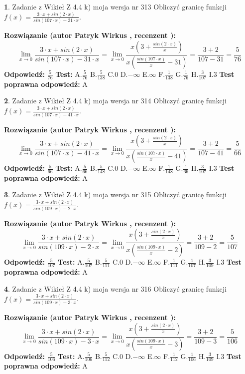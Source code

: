 \documentclass[12pt, a4paper]{article}
\theoremstyle{definition} %
\newtheorem{zad}{}
\newcommand{\zadStart}[1]{\begin{zad}#1\newline}
\newcommand{\zadStop}{\end{zad}}
\newcommand{\rozwStart}[2]{\noindent \textbf{Rozwiązanie (autor #1 , recenzent #2): }\newline}
\newcommand{\rozwStop}{\newline}
\newcommand{\odpStart}{\noindent \textbf{Odpowiedź:}\newline}
\newcommand{\odpStop}{\newline}
\newcommand{\testStart}{\noindent \textbf{Test:}\newline}
\newcommand{\testStop}{\newline}
\newcommand{\kluczStart}{\noindent \textbf{Test poprawna odpowiedź:}\newline}
\newcommand{\kluczStop}{\newline}
\begin{document}
\zadStart{Zadanie z Wikieł Z 4.4 k) moja wersja nr 313}
Obliczyć granicę funkcji $f(x)=\frac{3\cdot x +sin(2\cdot x)}{sin(107\cdot x) -31\cdot x}$.
\zadStop
\rozwStart{Patryk Wirkus}{}
$$\lim\limits_{x\to 0}\frac{3\cdot x +sin(2\cdot x)}{sin(107\cdot x) -31\cdot x}
=\lim\limits_{x\to 0}\frac{x(3+\frac{sin(2\cdot x)}{x})}{x(\frac{sin(107\cdot x)}{x}-31)}
=\frac{3+2}{107-31} = \frac{5}{76}$$
\rozwStop
\odpStart
$\frac{5}{76}$
\odpStop
\testStart
A.$\frac{5}{76}$
B.$\frac{5}{138}$
C.$0$
D.$-\infty$
E.$\infty$
F.$\frac{1}{138}$
G.$\frac{1}{76}$
H.$\frac{3}{107}$
I.$3$
\testStop
\kluczStart
A
\kluczStop



\zadStart{Zadanie z Wikieł Z 4.4 k) moja wersja nr 314}
Obliczyć granicę funkcji $f(x)=\frac{3\cdot x +sin(2\cdot x)}{sin(107\cdot x) -41\cdot x}$.
\zadStop
\rozwStart{Patryk Wirkus}{}
$$\lim\limits_{x\to 0}\frac{3\cdot x +sin(2\cdot x)}{sin(107\cdot x) -41\cdot x}
=\lim\limits_{x\to 0}\frac{x(3+\frac{sin(2\cdot x)}{x})}{x(\frac{sin(107\cdot x)}{x}-41)}
=\frac{3+2}{107-41} = \frac{5}{66}$$
\rozwStop
\odpStart
$\frac{5}{66}$
\odpStop
\testStart
A.$\frac{5}{66}$
B.$\frac{5}{148}$
C.$0$
D.$-\infty$
E.$\infty$
F.$\frac{1}{148}$
G.$\frac{1}{66}$
H.$\frac{3}{107}$
I.$3$
\testStop
\kluczStart
A
\kluczStop



\zadStart{Zadanie z Wikieł Z 4.4 k) moja wersja nr 315}
Obliczyć granicę funkcji $f(x)=\frac{3\cdot x +sin(2\cdot x)}{sin(109\cdot x) -2\cdot x}$.
\zadStop
\rozwStart{Patryk Wirkus}{}
$$\lim\limits_{x\to 0}\frac{3\cdot x +sin(2\cdot x)}{sin(109\cdot x) -2\cdot x}
=\lim\limits_{x\to 0}\frac{x(3+\frac{sin(2\cdot x)}{x})}{x(\frac{sin(109\cdot x)}{x}-2)}
=\frac{3+2}{109-2} = \frac{5}{107}$$
\rozwStop
\odpStart
$\frac{5}{107}$
\odpStop
\testStart
A.$\frac{5}{107}$
B.$\frac{5}{111}$
C.$0$
D.$-\infty$
E.$\infty$
F.$\frac{1}{111}$
G.$\frac{1}{107}$
H.$\frac{3}{109}$
I.$3$
\testStop
\kluczStart
A
\kluczStop



\zadStart{Zadanie z Wikieł Z 4.4 k) moja wersja nr 316}
Obliczyć granicę funkcji $f(x)=\frac{3\cdot x +sin(2\cdot x)}{sin(109\cdot x) -3\cdot x}$.
\zadStop
\rozwStart{Patryk Wirkus}{}
$$\lim\limits_{x\to 0}\frac{3\cdot x +sin(2\cdot x)}{sin(109\cdot x) -3\cdot x}
=\lim\limits_{x\to 0}\frac{x(3+\frac{sin(2\cdot x)}{x})}{x(\frac{sin(109\cdot x)}{x}-3)}
=\frac{3+2}{109-3} = \frac{5}{106}$$
\rozwStop
\odpStart
$\frac{5}{106}$
\odpStop
\testStart
A.$\frac{5}{106}$
B.$\frac{5}{112}$
C.$0$
D.$-\infty$
E.$\infty$
F.$\frac{1}{112}$
G.$\frac{1}{106}$
H.$\frac{3}{109}$
I.$3$
\testStop
\kluczStart
A
\kluczStop
\end{document}
